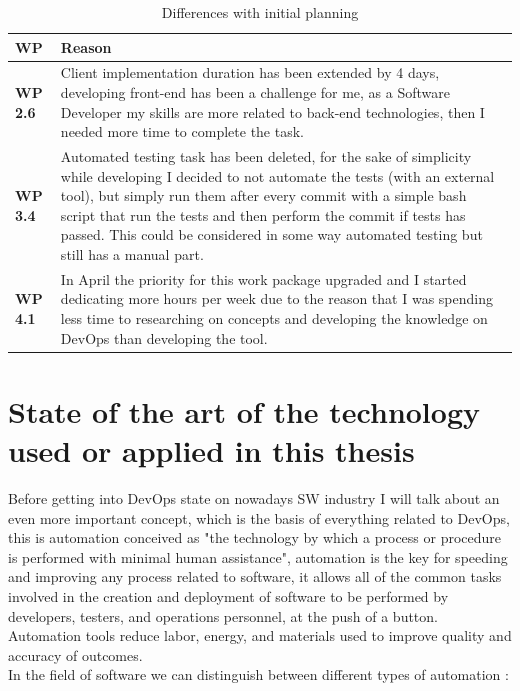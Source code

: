 \documentclass{article}
\begin{document}
\begin{table}[H]
\begin{tabularx}{\textwidth}{|l|X|}
\hline
\textbf{WP} & \textbf{Reason} \\ \hline
\textbf{WP 2.6} & Client implementation duration has been extended by 4 days, developing front-end has been a challenge for me, as a Software Developer my skills are more related to back-end technologies, then I needed more time to complete the task. \\ \hline
\textbf{WP 3.4} & Automated testing task has been deleted, for the sake of simplicity while developing I decided to not automate the tests (with an external tool), but simply run them after every commit with a simple bash script that run the tests and then perform the commit if tests has passed. This could be considered in some way automated testing but still has a manual part. \\ \hline
\textbf{WP 4.1} &  In April the priority for this work package upgraded and I started dedicating more hours per week due to the reason that I was spending less time to researching on concepts and developing the knowledge on DevOps than developing the tool.\\ \hline
\end{tabularx}
\caption{Differences with initial planning}
\end{table}
\newpage
\section{State of the art of the technology used or applied in this thesis}

Before getting into DevOps state on nowadays SW industry I will talk about an even more important concept, which is the basis of everything related to DevOps, this is automation conceived as "the technology by which a process or procedure is performed with minimal human assistance", automation is the key for speeding and improving any process related to software, it allows all of the common tasks involved in the creation and deployment of software to be performed by developers, testers, and operations personnel, at the push of a button. Automation tools reduce labor, energy, and materials used to improve quality and accuracy of outcomes.
~\\
In the field of software we can distinguish between different types of automation :
\end{document}
